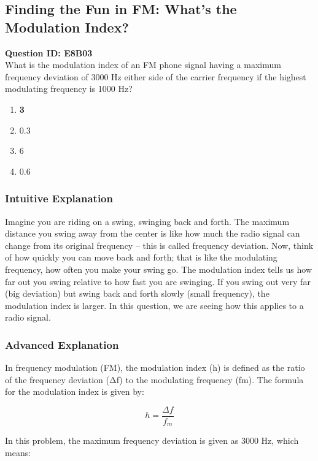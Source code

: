 \subsection{Finding the Fun in FM: What's the Modulation Index?}

\begin{tcolorbox}
    \textbf{Question ID: E8B03} \\
    What is the modulation index of an FM phone signal having a maximum frequency deviation of 3000 Hz either side of the carrier frequency if the highest modulating frequency is 1000 Hz? \\

    \begin{enumerate}[label=\Alph*.]
        \item \textbf{3}
        \item 0.3
        \item 6
        \item 0.6
    \end{enumerate}
\end{tcolorbox}

\subsubsection{Intuitive Explanation}
Imagine you are riding on a swing, swinging back and forth. The maximum distance you swing away from the center is like how much the radio signal can change from its original frequency – this is called frequency deviation. Now, think of how quickly you can move back and forth; that is like the modulating frequency, how often you make your swing go. The modulation index tells us how far out you swing relative to how fast you are swinging. If you swing out very far (big deviation) but swing back and forth slowly (small frequency), the modulation index is larger. In this question, we are seeing how this applies to a radio signal.

\subsubsection{Advanced Explanation}
In frequency modulation (FM), the modulation index (h) is defined as the ratio of the frequency deviation (Δf) to the modulating frequency (fm). The formula for the modulation index is given by:

\[
h = \frac{\Delta f}{f_m}
\]

In this problem, the maximum frequency deviation is given as 3000 Hz, which means:

